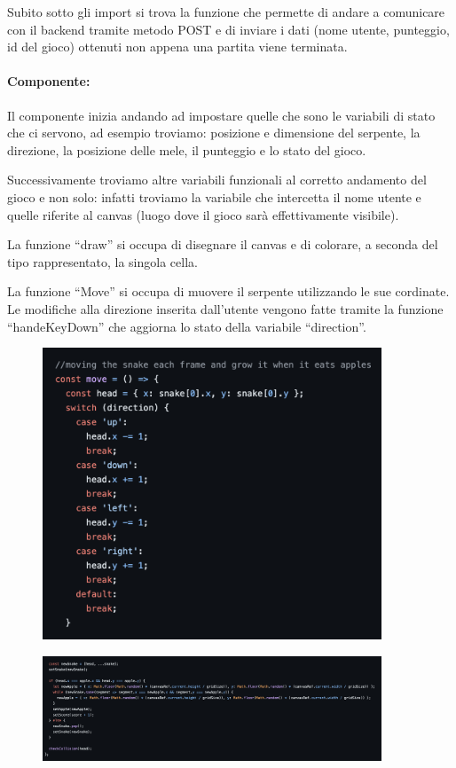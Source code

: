 \documentclass{article}
\begin{document}
Subito sotto gli import si trova la funzione che permette di andare a comunicare con il backend tramite metodo POST e di inviare i dati (nome utente, punteggio, id del gioco) ottenuti non appena una partita viene terminata.


\paragraph{Componente:}
Il componente inizia andando ad impostare quelle che sono le variabili di stato che ci servono, ad esempio troviamo: posizione e dimensione del serpente, la direzione, la posizione delle mele, il punteggio e lo stato del gioco. 

Successivamente troviamo altre variabili funzionali al corretto andamento del gioco e non solo: infatti troviamo la variabile che intercetta il nome utente e quelle riferite al canvas (luogo dove il gioco sarà effettivamente visibile).

La funzione “draw” si occupa di disegnare il canvas e di colorare, a seconda del tipo rappresentato, la singola cella.

La funzione “Move” si occupa di muovere il serpente utilizzando le sue cordinate.
Le modifiche alla direzione inserita dall’utente vengono fatte tramite la funzione “handeKeyDown” che aggiorna lo stato della variabile “direction”.

\begin{figure}[H]
    \centering
    \includegraphics[width=0.9\textwidth]{images/snake_move1.png}
\end{figure}
\begin{figure}[H]
    \centering
    \includegraphics[width=0.9\textwidth]{images/snake_move2.png}
\end{figure}
\end{document}
